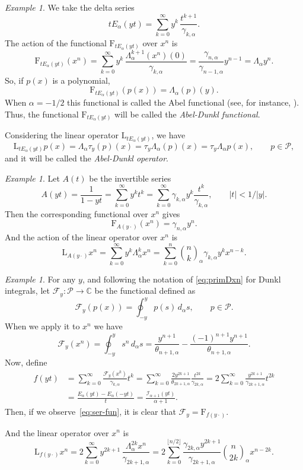 \documentclass[11pt]{article}
\theoremstyle{plain}
\theoremstyle{remark}
\newtheorem{example}[theorem]{Example}
\numberwithin{equation}{section} %
\newcommand{\Ea}{E_{\alpha}}
\newcommand{\La}{\Lambda_{\alpha}}
\newcommand{\binoma}[2]{\binom{#1}{#2}_{\!\alpha}}
\newcommand{\I}{\mathcal{I}}
\newcommand{\calP}{\mathcal{P}}
\newcommand{\CC}{\mathbb{C}}
\newcommand{\FF}{\mathrm{F}}
\newcommand{\LL}{\mathrm{L}}
\begin{document}
\begin{example}
We take the delta series
\begin{equation}
\label{def:a-d}
t\Ea(yt) = \sum_{k=0}^{\infty} {y^k} \, \frac{t^{k+1}}{\gamma_{k,\alpha}}.
\end{equation}
The action of the functional $\FF_{t\Ea(yt)}$ over $x^n$ is
\[
\FF_{t \Ea(yt)}(x^n) = \sum_{k=0}^{\infty} {y^k}\, \frac{\La^{k+1}(x^n)(0)}{\gamma_{k,\alpha}} 
= \frac{\gamma_{n,\alpha}}{\gamma_{n-1,\alpha}}y^{n-1} = \La y^n.
\] 
So, if $p(x)$ is a polynomial, 
\[
\FF_{t \Ea(yt)}(p(x)) = \La(p)(y).
\]
When $\alpha = -1/2$ this functional is called the Abel functional (see, for instance, \cite[Chapter~2, \S\,6, Example~3, p.~29]{Rom}). Thus, the functional $\FF_{t\Ea(yt)}$ will be called the \textit{Abel-Dunkl functional}.

Considering the linear operator $\LL_{t \Ea(yt)}$, we have
\[
\LL_{t \Ea(yt)}p(x) = \La\tau_y(p)(x) = \tau_y\La(p)(x) = \tau_y\La p(x),\qquad p\in\calP,
\]
and it will be called the \textit{Abel-Dunkl operator}.
\end{example}

\begin{example}
Let $A(t)$ be the invertible series
\[
A(yt) = \frac{1}{1-yt} = \sum_{k=0}^{\infty} y^kt^k 
= \sum_{k=0}^{\infty} \gamma_{k,\alpha}y^k \frac{t^k}{\gamma_{k,\alpha}}, \qquad |t| < 1/|y|.
\]
Then the corresponding functional over $x^n$ gives
\[
\FF_{A(y\cdot)}(x^n) = \gamma_{n,\alpha}y^n.
\]
And the action of the linear operator over $x^n$ is
\[
\LL_{A(y\cdot)}x^n = \sum_{k=0}^{\infty} y^k\La^kx^n 
= \sum_{k=0}^n \binoma{n}{k}\gamma_{k,\alpha}y^kx^{n-k}.
\] 
\end{example}

\begin{example}
For any $y$, and following the notation of \eqref{eq:primDxn} for Dunkl integrals, let $\mathcal{F}_y : \calP \to \CC$ be the functional defined as 
\[
\mathcal{F}_y(p(x)) = \oint_{-y}^y p(s)\,d_\alpha s,
\qquad p \in \calP.
\]
When we apply it to $x^n$ we have
\[
\mathcal{F}_y(x^n) = \oint_{-y}^y s^n\,d_\alpha s 
= \frac{y^{n+1}}{\theta_{n+1,\alpha}} - \frac{(-1)^{n+1}y^{n+1}}{\theta_{n+1,\alpha}}.
\]
Now, define
\begin{align*}
f(yt) & = \sum_{k=0}^{\infty} \frac{\mathcal{F}_y(x^k)}{\gamma_{k,\alpha}}t^k 
= \sum_{k=0}^{\infty} \frac{2y^{2k+1}}{\theta_{2k+1,\alpha}} \frac{t^{2k}}{\gamma_{2k,\alpha}}
= 2\sum_{k=0}^{\infty} \frac{y^{2k+1}}{\gamma_{2k+1,\alpha}}t^{2k} \\
& = \frac{\Ea(yt)-\Ea(-yt)}{t} = \frac{\I_{\alpha+1}(yt)}{\alpha+1}.
\end{align*}
Then, if we observe~\eqref{eq:ser-fun}, it is clear that $\mathcal{F}_y = \FF_{f(y\cdot)}$.

And the linear operator over $x^n$ is
\begin{equation}
\label{eq:bernoulli}
\LL_{f(y\cdot)} x^n = 2\sum_{k=0}^\infty {y^{2k+1}} \, \frac{\La^{2k}x^n}{\gamma_{2k+1,\alpha}}
= 2 \sum_{k=0}^{\lfloor n/2\rfloor} 
\frac{\gamma_{2k,\alpha}y^{2k+1}}{\gamma_{2k+1,\alpha}} \binoma{n}{2k}x^{n-2k}.
\end{equation}
\end{example}
\end{document}
